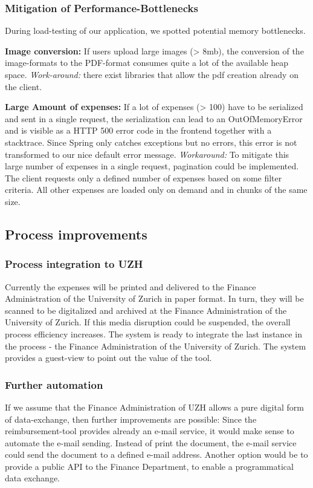 \subsubsection{Mitigation of Performance-Bottlenecks}
During load-testing of our application, we spotted potential memory bottlenecks. 

\textbf{Image conversion:} If users upload large images (> 8mb), the conversion of the image-formats to the PDF-format consumes quite a lot of the available heap space. \textit{Work-around:} there exist libraries that allow the pdf creation already on the client.\par 
 	
\textbf{Large Amount of expenses:} If a lot of expenses (> 100) have to be serialized and sent in a single request, the serialization can lead to an OutOfMemoryError and is visible as a HTTP 500 error code in the frontend together with a stacktrace. Since Spring only catches exceptions but no errors, this error is not transformed to our nice default error message. \textit{Workaround: } To mitigate this large number of expenses in a single request, pagination could be implemented. The client requests only a defined number of expenses based on some filter criteria. All other expenses are loaded only on demand and in chunks of the same size.



\subsection{Process improvements}
\subsubsection{Process integration to UZH}
Currently the expenses will be printed and delivered to the Finance Administration of the University of Zurich in paper format. In turn, they will be scanned to be digitalized and archived at the Finance Administration of the University of Zurich. If this media disruption could be suspended, the overall process efficiency increases. The system is ready to integrate the last instance in the process - the Finance Administration of the University of Zurich. The system provides a guest-view to point out the value of the tool.\par

\subsubsection{Further automation}
If we assume that the Finance Administration of UZH allows a pure digital form of data-exchange, then further improvements are possible: Since the reimbursement-tool provides already an e-mail service, it would make sense to automate the e-mail sending. Instead of print the document, the e-mail service could send the document to a defined e-mail address. Another option would be to provide a public API to the Finance Department, to enable a programmatical data exchange.\par 

